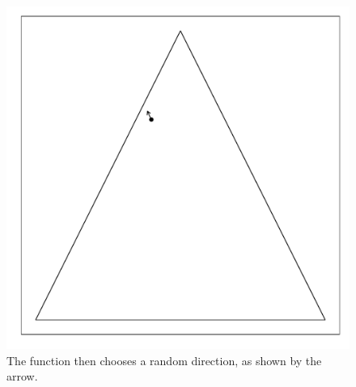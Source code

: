 \documentclass{article}\usepackage{graphicx, color}
\makeatletter
\def\maxwidth{ %
  \ifdim\Gin@nat@width>\linewidth
    \linewidth
  \else
    \Gin@nat@width
  \fi
}
\newenvironment{knitrout}{}{} %
\makeatother
\begin{document}
\begin{figure}[H]
\begin{knitrout}
\color{fgcolor}
\includegraphics[width=\maxwidth]{figure/hitandrun_walkthrough2} 

\end{knitrout}

\caption{The function then chooses a random direction, as shown by the arrow.}
\end{figure}
\end{document}
